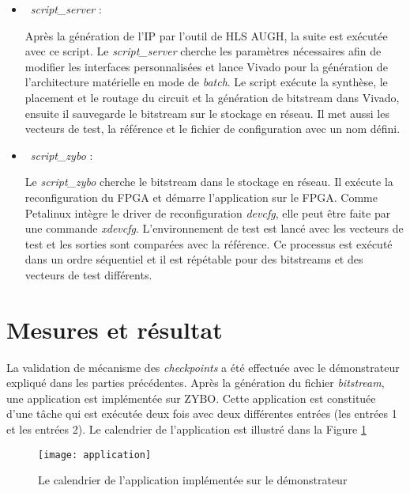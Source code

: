 \begin{itemize}
	\item\
	\emph{script\_server} :
	
	Après la génération de l'IP par l'outil de HLS AUGH, la suite est exécutée avec ce script. Le \emph{script\_server}
	cherche les paramètres nécessaires afin de modifier les interfaces personnalisées et lance Vivado pour la génération
	de l'architecture matérielle en mode de \emph{batch}. Le script exécute la synthèse, le placement et le routage du circuit et 
	la génération de bitstream dans Vivado, ensuite il sauvegarde le bitstream sur le stockage en réseau.
	Il met aussi les vecteurs de test, la référence et le fichier de configuration avec un nom défini.

	\item\
	\emph{script\_zybo} :
	
	Le \emph{script\_zybo} cherche le bitstream dans le stockage en réseau. Il exécute la reconfiguration du FPGA et démarre
	l'application sur le FPGA. Comme Petalinux intègre le driver de reconfiguration \emph{devcfg}, elle peut
	être faite par une commande \emph{xdevcfg}. L'environnement de test est lancé avec les vecteurs de test et les sorties
	sont comparées avec la référence. Ce processus est exécuté dans un ordre séquentiel et il est répétable pour des
	bitstreams et des vecteurs de test différents.
	
\end{itemize}

\section{Mesures et résultat} %

La validation de mécanisme des \emph{checkpoints} a été effectuée avec le démonstrateur expliqué dans les parties précédentes.
Après la génération du fichier \emph{bitstream}, une application est implémentée sur ZYBO. Cette application est constituée
d'une tâche qui est exécutée deux fois avec deux différentes entrées (les entrées 1 et les entrées 2). Le calendrier de l'application
est illustré dans la Figure \ref{fig:application}

\begin{figure}[h]
	\centering
	\texttt{[image: application]}
	\caption{Le calendrier de l'application implémentée sur le démonstrateur}
	\label{fig:application}
	\vspace{-2mm}
\end{figure}

